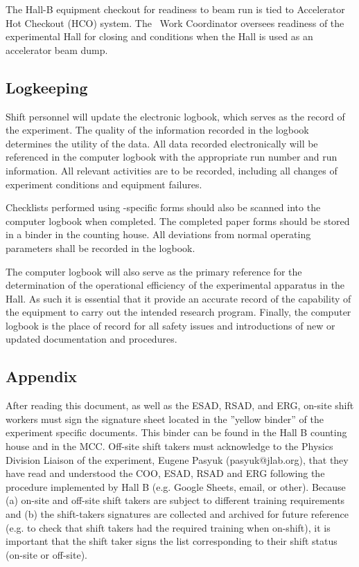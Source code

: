 \documentclass[11pt]{article}
\begin{document}
The Hall-B equipment checkout for readiness to beam run
is tied to Accelerator Hot Checkout (HCO) system. 
The \HALL\ Work Coordinator oversees readiness of the experimental Hall for closing and 
conditions when the Hall is used as an accelerator beam dump. 

\subsection{Logkeeping}
\indent

Shift personnel will update the electronic
logbook, which serves as the record of the experiment. 
The quality of the information recorded in the logbook 
determines the utility of the data.
All data recorded electronically
will be referenced in the  computer 
logbook with the appropriate run number and run information. All 
relevant activities are to be recorded, including 
all changes of experiment conditions and equipment failures.

Checklists performed using \HALL-specific forms should also be scanned 
into the computer logbook when completed. The completed paper forms should 
be stored in a binder in the counting house.  All deviations from normal 
operating parameters shall  be recorded in the logbook. 

The computer logbook will also serve as the primary reference for the
determination of the operational efficiency of the experimental apparatus in
the Hall. As such it is essential that it provide an accurate record of the 
capability of the equipment to carry out the intended research program. 
Finally, the computer logbook is the place of record for all safety issues and 
introductions of new or updated documentation and procedures.

\begin{appendices}
\section{Appendix}
\indent
After reading this document, as well as the ESAD, RSAD, and ERG, on-site shift workers must sign the signature sheet located in the ”yellow binder” of the experiment specific documents. This binder can be found in the Hall B counting house and in the MCC. Off-site shift takers must acknowledge to the Physics Division Liaison of the experiment, Eugene Pasyuk (pasyuk@jlab.org), that they have read and understood the COO, ESAD, RSAD and ERG following the procedure implemented by Hall B (e.g. Google Sheets, email, or other). Because (a) on-site and off-site shift takers are subject to different training requirements and (b) the shift-takers signatures are collected and archived for future reference (e.g. to check that shift takers had the required training when on-shift), it is important that the shift taker signs the list corresponding to their shift status (on-site or off-site).
\end{appendices}
\end{document}
